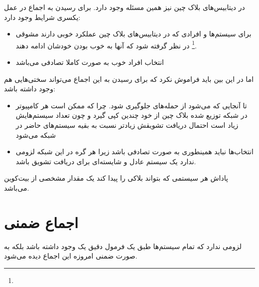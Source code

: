 \documentclass[10pt, a4paper]{article}
\begin{document}
در دیتابیس‌های بلاک چین نیز همین مسئله وجود دارد. برای رسیدن به اجماع در عمل
یکسری شرایط وجود دارد:

\begin{itemize}
    \item برای سیستم‌ها و افرادی که در دیتابیس‌های بلاک چین عملکرد خوبی دارند
    مشوقی \footnote{} در نظر گرفته شود که آنها به خوب بودن خودشان
    ادامه دهند.
    \item انتخاب افراد خوب به صورت کاملا تصادفی می‌باشد
\end{itemize}

اما در این بین باید فراموش نکرد که برای رسیدن به این اجماع می‌تواند سختی‌هایی هم
وجود داشته باشد:

\begin{itemize}
    \item تا آنجایی که می‌شود از حمله‌های  جلوگیری شود. چرا که ممکن
    است هر کامپیوتر در شبکه توزیع شده بلاک چین از خود چندین کپی گیرد و چون تعداد
    سیستم‌هایش زیاد است احتمال دریافت تشویقش زیادتر نسبت به بقیه سیستم‌های حاضر
    در شبکه می‌شود
    \item انتخاب‌ها نباید همینطوری به صورت تصادفی باشد زیرا هر گره در این شبکه
    لزومی ندارد یک سیستم عادل و شایسته‌ای برای دریافت تشویق باشد.
\end{itemize}

پاداش هر سیستمی که بتواند بلاکی را پیدا کند یک مقدار مشخصی از بیت‌کوین می‌باشد.

\section{اجماع ضمنی}

لزومی ندارد که تمام سیستم‌ها طبق یک فرمول دقیق یک  وجود داشته باشد
بلکه به صورت ضمنی امروزه این اجماع دیده می‌شود.
\end{document}
